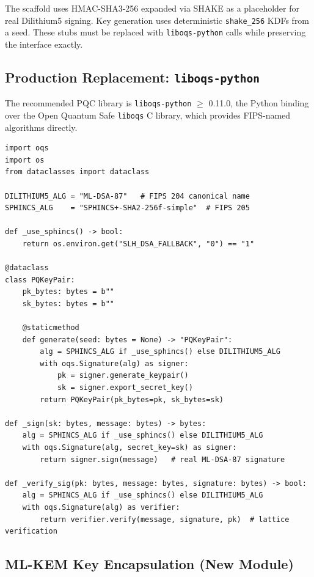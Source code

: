 \documentclass[12pt,letterpaper]{article}
\theoremstyle{plain}
\theoremstyle{definition}
\begin{document}
\noindent The scaffold uses HMAC-SHA3-256 expanded via SHAKE as a placeholder
for real Dilithium5 signing. Key generation uses deterministic
\texttt{shake\_256} KDFs from a seed. These stubs must be replaced with
\texttt{liboqs-python} calls while preserving the interface exactly.

\subsection{Production Replacement: \texttt{liboqs-python}}

The recommended PQC library is \texttt{liboqs-python} $\geq$ 0.11.0, the
Python binding over the Open Quantum Safe \texttt{liboqs} C library, which
provides FIPS-named algorithms directly.

\begin{lstlisting}[caption={Production PQKeyPair using liboqs-python (ML-DSA-87)}]
import oqs
import os
from dataclasses import dataclass

DILITHIUM5_ALG = "ML-DSA-87"   # FIPS 204 canonical name
SPHINCS_ALG    = "SPHINCS+-SHA2-256f-simple"  # FIPS 205

def _use_sphincs() -> bool:
    return os.environ.get("SLH_DSA_FALLBACK", "0") == "1"

@dataclass
class PQKeyPair:
    pk_bytes: bytes = b""
    sk_bytes: bytes = b""

    @staticmethod
    def generate(seed: bytes = None) -> "PQKeyPair":
        alg = SPHINCS_ALG if _use_sphincs() else DILITHIUM5_ALG
        with oqs.Signature(alg) as signer:
            pk = signer.generate_keypair()
            sk = signer.export_secret_key()
        return PQKeyPair(pk_bytes=pk, sk_bytes=sk)

def _sign(sk: bytes, message: bytes) -> bytes:
    alg = SPHINCS_ALG if _use_sphincs() else DILITHIUM5_ALG
    with oqs.Signature(alg, secret_key=sk) as signer:
        return signer.sign(message)   # real ML-DSA-87 signature

def _verify_sig(pk: bytes, message: bytes, signature: bytes) -> bool:
    alg = SPHINCS_ALG if _use_sphincs() else DILITHIUM5_ALG
    with oqs.Signature(alg) as verifier:
        return verifier.verify(message, signature, pk)  # lattice verification
\end{lstlisting}

\subsection{ML-KEM Key Encapsulation (New Module)}
\end{document}
